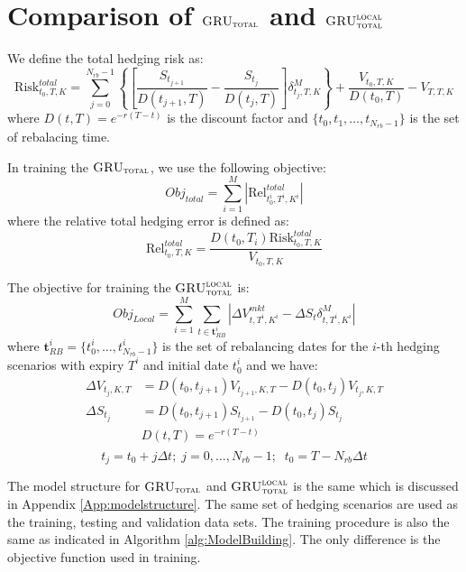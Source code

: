 \documentclass[letterpaper,12pt,titlepage,oneside,final]{book}
\numberwithin{equation}{section}
\theoremstyle{definition}
\newcommand{\modelT}{\textsc{GRU}_{\textsc{total}}}
\newcommand{\modelL}{\textsc{GRU}_{\textsc{total}}^{\textsc{local}}}
\newcommand{\DS}{\Delta S}
\newcommand{\DT}{\Delta t}
\newcommand{\Smkt}{S}
\begin{document}
\chapter{Comparison of $\modelT$ and  $\modelL$}

\label{App:CompareLocalVSTotal}
We define the total hedging risk as:
 \begin{equation}
\text{Risk}^{total}_{t_0,T,K}=\sum_{j=0}^{N_{rb}-1}\left\{ \left[\frac{\Smkt_{t_{j+1}}}{D(t_{j+1},T)}-\frac{\Smkt_{t_{j}}}{D(t_{j},T)}\right] \delta^M_{t_j,T,K} \right\}+\frac{V_{t_0,T,K}}{D(t_{0},T)}-V_{T,T,K}
\label{eq:AppTotalRiskCh6}
\end{equation}
where
$D(t,T)=e^{-r(T-t)}$ is the discount factor and $\{t_0,t_1, \dots, t_{N_{rb}-1}\}$ is the set of rebalacing time.

In training the $\modelT$, we use the following objective:
\begin{equation}
Obj_{total}=\sum_{i=1}^M \left|\text{Rel}^{total}_{t^i_0,T^i,K^i}\right|
\label{eq:ApptotalObjLinear}
\end{equation}
where the relative total hedging error is defined as:
\begin{equation}
\text{Rel}^{total}_{t_0,T,K}
=\frac{D(t_0,T_i)  \text{Risk}^{total}_{t_0,T,K}}{V_{t_0,T,K}}
\label{eq:ApprelHError}
\end{equation}

The objective for training the  $\modelL$  is:
\begin{equation}
Obj_{Local}=\sum_{i=1}^M \sum_{t\in \mathbf{t}^i_{RB}} |\Delta V^{mkt}_{t,T^i,K^i}-\DS_{t} \delta^{M}_{t,T^i,K^i}|
\label{eq:AppLocalObjNew}
\end{equation}
where $\mathbf{t}^i_{RB}=\{t^i_0,\dots, t^i_{N_{rb}-1}\}$ is the set of rebalancing dates for the $i$-th hedging scenarios with expiry $T^i$ and initial date $t^i_0$ and we have:
\[
\begin{split}
\Delta V^{}_{t_j,K,T}& =D(t_0,t_{j+1}) V^{}_{t_{j+1},K,T}-D(t_0,t_{j})V^{}_{t_j,K,T}\\
\Delta \Smkt_{t_j} &=D(t_0,t_{j+1}) \Smkt_{t_{j+1}}-D(t_0,t_{j}) \Smkt_{t_{j}}\\
&D(t,T)=e^{-r(T-t)}\\
\end{split}
\]
\[
t_j=t_0+j \Delta t;\; j=0,\dots,N_{rb}-1;\;\;t_0=T-N_{rb}\DT
\]

The model structure for $\modelT$ and  $\modelL$ is the same which is discussed in Appendix \ref{App:modelstructure}. The same set of hedging scenarios are used as the training, testing and validation data sets. The training procedure is also the same as indicated in Algorithm \ref{alg:ModelBuilding}. The only difference is the objective function used in training.
\end{document}
